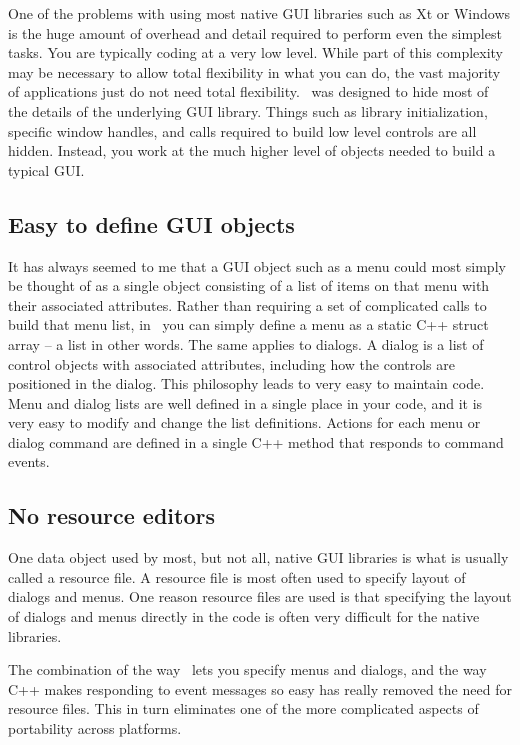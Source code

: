One of the problems with using most native GUI libraries such
as Xt or Windows is the huge amount of overhead and detail required
to perform even the simplest tasks. You are typically coding at a
very low level. While part of this complexity may be necessary to
allow total flexibility in what you can do, the vast majority of
applications just do not need total flexibility. \V\ was designed
to hide most of the details of the underlying GUI library. Things
such as library initialization, specific window handles, and
calls required to build low level controls are all hidden.
Instead, you work at the much higher level of objects needed to
build a typical GUI.

\subsection*{Easy to define GUI objects}

It has always seemed to me that a GUI object such as a menu could
most simply be thought of as a single object consisting of a list
of items on that menu with their associated attributes. Rather than
requiring a set of complicated calls to build that menu list, in
\V\ you can simply define a menu as a static C++ struct array --
a list in other words. The same applies to dialogs. A dialog is a
list of control objects with associated attributes, including
how the controls are positioned in the dialog. This philosophy leads
to very easy to maintain code. Menu and dialog lists are well
defined in a single place in your code, and it is very easy to
modify and change the list definitions. Actions for each menu or
dialog command are defined in a single C++ method that responds
to command events.

\subsection*{No resource editors}

One data object used by most, but not all, native GUI libraries
is what is usually called a resource file. A resource file is
most often used to specify layout of dialogs and menus. One
reason resource files are used is that specifying the layout of
dialogs and menus directly in the code is often very difficult
for the native libraries.

The combination of the way \V\ lets you specify menus and dialogs,
and the way C++ makes responding to event messages so easy has really
removed the need for resource files. This in turn eliminates one
of the more complicated aspects of portability across platforms.

